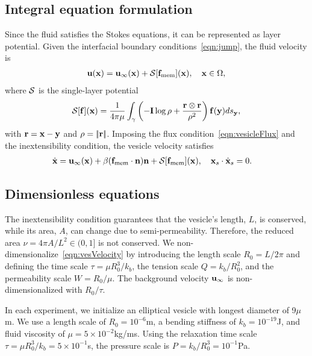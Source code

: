 \documentclass[9pt,twocolumn,twoside,lineno]{pnas-new}
\begin{document}
\subsection*{Integral equation formulation}
Since the fluid satisfies the Stokes equations, it can be represented as
layer potential. Given the interfacial boundary
conditions~\eqref{eqn:jump}, the fluid velocity is
\begin{align}
  \mathbf{u}(\mathbf{x}) = \mathbf{u}_\infty(\mathbf{x}) + \mathcal{S}[\mathbf{f}_\mathrm{mem}](\mathbf{x}), \quad
    \mathbf{x} \in \Omega,
\end{align}
where $\mathcal{S}$ is the single-layer potential
\begin{align}
  \mathcal{S}[\mathbf{f}](\mathbf{x}) = \frac{1}{4\pi\mu} \int_{\gamma} \left(
    -\mathbf{I} \log\rho + \frac{\mathbf{r} \otimes \mathbf{r}}{\rho^2} \right)
    \mathbf{f}(\mathbf{y}) ds_{\mathbf{y}},
\end{align}
with $\mathbf{r} = \mathbf{x} - \mathbf{y}$ and $\rho = |\!| \mathbf{r} |\!|$. Imposing the flux
condition~\eqref{eqn:vesicleFlux} and the inextensibility condition, the
vesicle velocity satisfies
\begin{align}
  \label{eqn:vesVelocity}
  \dot{\mathbf{x}} &= \mathbf{u}_\infty(\mathbf{x}) + \beta (\mathbf{f}_\mathrm{mem}\cdot\mathbf{n})\mathbf{n}
  + \mathcal{S} [\mathbf{f}_\mathrm{mem}](\mathbf{x}),  \quad
  \mathbf{x}_s \cdot \dot{\mathbf{x}}_s = 0.
\end{align}

\subsection*{Dimensionless equations}
The inextensibility condition guarantees that the vesicle's length, $L$,
is conserved, while its area, $A$, can change due to semi-permeability.
Therefore, the reduced area $\nu = 4\pi A/L^2 \in (0,1]$ is not
conserved. We non-dimensionalize~\eqref{eqn:vesVelocity} by introducing
the length scale $R_0 = L/2\pi$ and defining the time scale $\tau = \mu
R_0^3/k_b$, the tension scale $Q = k_b/R_0^2$, and the permeability
scale $W = R_0/\mu$. The background velocity $\mathbf{u}_\infty$ is
non-dimensionalized with $R_0/\tau$.

In each experiment, we initialize an elliptical vesicle with longest
diameter of 9$\mu$m. We use a length scale of $R_0 = 10^{-6}$m, a
bending stiffness of $k_b = 10^{-19}$J, and fluid viscosity of $\mu=5
\times 10^{-2}$kg/ms. Using the relaxation time scale $\tau = \mu
R_0^3/k_b = 5 \times 10^{-1}$s, the pressure scale is $P = k_b/R_0^3 =
10^{-1}$Pa. 
\end{document}
